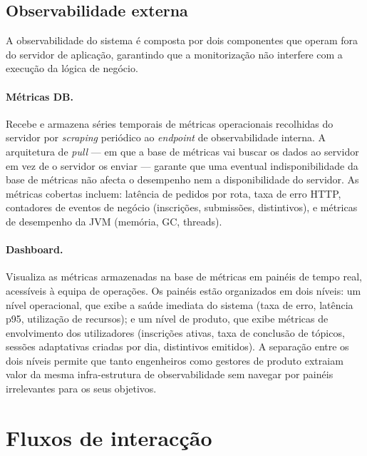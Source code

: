 \subsection{Observabilidade externa}
\label{ssec:observabilidade}

A observabilidade do sistema \'e composta por dois componentes que operam
fora do servidor de aplica\c{c}\~ao, garantindo que a monitoriza\c{c}\~ao
n\~ao interfere com a execu\c{c}\~ao da l\'ogica de neg\'ocio.

\paragraph{M\'etricas DB.}
Recebe e armazena s\'eries temporais de m\'etricas operacionais recolhidas
do servidor por \emph{scraping} peri\'odico ao \emph{endpoint} de
observabilidade interna. A arquitetura de \emph{pull} --- em que a base de
m\'etricas vai buscar os dados ao servidor em vez de o servidor os enviar ---
garante que uma eventual indisponibilidade da base de m\'etricas n\~ao afecta
o desempenho nem a disponibilidade do servidor. As m\'etricas cobertas
incluem: lat\^encia de pedidos por rota, taxa de erro HTTP, contadores de
eventos de neg\'ocio (inscri\c{c}\~oes, submiss\~oes, distintivos), e
m\'etricas de desempenho da JVM (mem\'oria, GC, threads).

\paragraph{Dashboard.}
Visualiza as m\'etricas armazenadas na base de m\'etricas em pain\'eis de
tempo real, acess\'iveis \`a equipa de opera\c{c}\~oes. Os pain\'eis est\~ao
organizados em dois n\'iveis: um n\'ivel operacional, que exibe a sa\'ude
imediata do sistema (taxa de erro, lat\^encia p95, utiliza\c{c}\~ao de
recursos); e um n\'ivel de produto, que exibe m\'etricas de envolvimento dos
utilizadores (inscri\c{c}\~oes ativas, taxa de conclus\~ao de t\'opicos,
sess\~oes adaptativas criadas por dia, distintivos emitidos). A separa\c{c}\~ao
entre os dois n\'iveis permite que tanto engenheiros como gestores de produto
extraiam valor da mesma infra-estrutura de observabilidade sem navegar por
pain\'eis irrelevantes para os seus objetivos.

\section{Fluxos de interac\c{c}\~ao}
\label{sec:fluxos}

